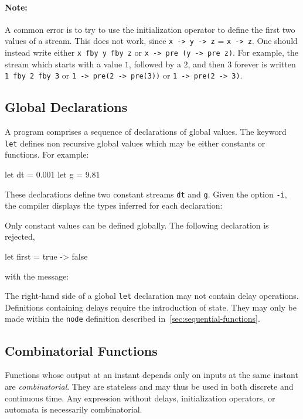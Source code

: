 \documentclass[11pt,titlepage,twoside]{report}
\newcommand{\zls}[1]{\texttt{#1}}
\newenvironment{sample}
  {\begin{flushright}\begin{minipage}[t]{15.3cm}\begin{alltt}\small}
  {\end{alltt}\end{minipage}\end{flushright}}
\begin{document}
\paragraph{Note:} A common error is to try to use the initialization 
operator to define the first two values of a
stream. This does not work, since \zls{x -> y -> z} =
\zls{x -> z}. One should instead write either \zls{x fby y fby z} or
\zls{x -> pre (y -> pre z)}.
For example, the stream which starts with a value
$1$, followed by a $2$, and then $3$ forever is written \zls{1 fby 2 fby 3}
or \mbox{\zls{1 -> pre(2 -> pre(3))}} or \zls{1 -> pre(2 -> 3)}.

\subsection{Global Declarations} %

A program comprises a sequence of declarations of global
values. The keyword \zls{let} defines non recursive global values which may
be either constants or functions. For example:
\begin{runverbatim}
let dt = 0.001
let g = 9.81
\end{runverbatim}
These declarations define two constant streams \zls{dt} and
\zls{g}.
Given the option \texttt{-i}, the compiler displays the types inferred for 
each declaration:
\begin{sample}\runverbatimcmd\end{sample}
\runverbatimmsg{}
Only constant values can be defined globally.
The following declaration is rejected,
\begin{runverbatim}[fail]
let first = true -> false
\end{runverbatim}
with the message:
\begin{sample}\runverbatimcmd\end{sample}
\runverbatimerr{}
The right-hand side of a global \zls{let} declaration may not contain delay 
operations. Definitions containing delays require the introduction of state.
They may only be made within the \zls{node} definition described 
in~\cref{sec:sequential-functions}.

\subsection{Combinatorial Functions} %

Functions whose output at an instant depends only on inputs at the same 
instant are \emph{combinatorial}.
They are stateless and may thus be used in both discrete and continuous 
time.
Any expression without delays, initialization operators, or automata is 
necessarily combinatorial.
\end{document}
